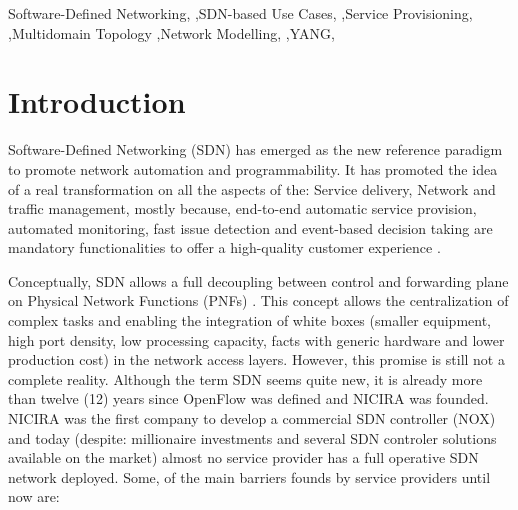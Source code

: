 \documentclass[a4paper,fleqn]{cas-dc}
\begin{document}


\begin{keywords}
Software-Defined Networking,
\sep SDN-based Use Cases, 
\sep Service Provisioning,
\sep Multidomain Topology
\sep Network Modelling, 
\sep YANG,  
\end{keywords}

\maketitle

\section{Introduction}
Software-Defined Networking (SDN) has emerged as the new reference paradigm to promote network automation and programmability. It has promoted the idea of a real transformation on all the aspects of the: Service delivery, Network and traffic management, mostly because, end-to-end automatic service provision, automated monitoring, fast issue detection and event-based decision taking are mandatory functionalities to offer a high-quality customer experience \cite{ordonez2017network,ong2017onf}.

Conceptually, SDN allows a full decoupling between control and forwarding plane on Physical Network Functions (PNFs) \cite{brief2014openflow}. 
This concept allows the centralization of complex tasks and enabling the integration of white boxes (smaller equipment, high port density, low processing capacity, facts with generic hardware and lower production cost) in the network access layers. However, this promise is still not a complete reality. Although the term SDN seems quite new, it is already more than twelve (12) years since OpenFlow \cite{brief2014openflow} was defined and NICIRA was founded. NICIRA was the first company to develop a commercial SDN controller (NOX) \cite{gude2008nox,tavakoli2009applying} and today (despite: millionaire investments and several SDN controler solutions available \cite{medved2014opendaylight,berde2014onos} on the market) almost no service provider has a full operative SDN network deployed. Some, of the main barriers founds by service providers until now are:
\end{document}
